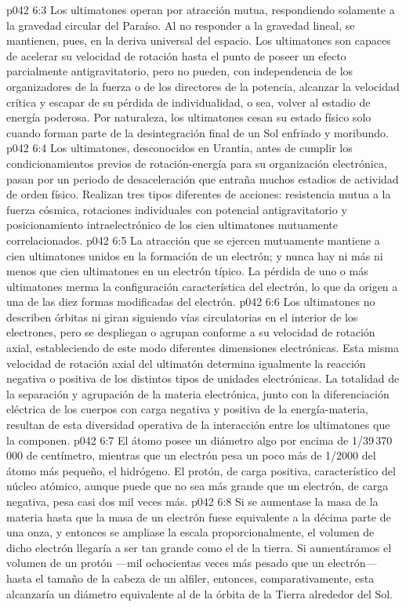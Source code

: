 \vs p042 6:3 \pc Los ultimatones operan por atracción mutua, respondiendo solamente a la gravedad circular del Paraíso. Al no responder a la gravedad lineal, se mantienen, pues, en la deriva universal del espacio. Los ultimatones son capaces de acelerar su velocidad de rotación hasta el punto de poseer un efecto parcialmente antigravitatorio, pero no pueden, con independencia de los organizadores de la fuerza o de los directores de la potencia, alcanzar la velocidad crítica y escapar de su pérdida de individualidad, o sea, volver al estadio de energía poderosa. Por naturaleza, los ultimatones cesan su estado físico solo cuando forman parte de la desintegración final de un Sol enfriado y moribundo.
\vs p042 6:4 \pc Los ultimatones, desconocidos en Urantia, antes de cumplir los condicionamientos previos de rotación\hyp{}energía para su organización electrónica, pasan por un periodo de desaceleración que entraña muchos estadios de actividad de orden físico. Realizan tres tipos diferentes de acciones: resistencia mutua a la fuerza cósmica, rotaciones individuales con potencial antigravitatorio y posicionamiento intraelectrónico de los cien ultimatones mutuamente correlacionados.
\vs p042 6:5 La atracción que se ejercen mutuamente mantiene a cien ultimatones unidos en la formación de un electrón; y nunca hay ni más ni menos que cien ultimatones en un electrón típico. La pérdida de uno o más ultimatones merma la configuración característica del electrón, lo que da origen a una de las diez formas modificadas del electrón.
\vs p042 6:6 Los ultimatones no describen órbitas ni giran siguiendo vías circulatorias en el interior de los electrones, pero se despliegan o agrupan conforme a su velocidad de rotación axial, estableciendo de este modo diferentes dimensiones electrónicas. Esta misma velocidad de rotación axial del ultimatón determina igualmente la reacción negativa o positiva de los distintos tipos de unidades electrónicas. La totalidad de la separación y agrupación de la materia electrónica, junto con la diferenciación eléctrica de los cuerpos con carga negativa y positiva de la energía\hyp{}materia, resultan de esta diversidad operativa de la interacción entre los ultimatones que la componen.
\vs p042 6:7 \pc El átomo posee un diámetro algo por encima de 1/39\,370\,000 de centímetro, mientras que un electrón pesa un poco más de 1/2000 del átomo más pequeño, el hidrógeno. El protón, de carga positiva, característico del núcleo atómico, aunque puede que no sea más grande que un electrón, de carga negativa, pesa casi dos mil veces más.
\vs p042 6:8 \pc Si se aumentase la masa de la materia hasta que la masa de un electrón fuese equivalente a la décima parte de una onza, y entonces se ampliase la escala proporcionalmente, el volumen de dicho electrón llegaría a ser tan grande como el de la tierra. Si aumentáramos el volumen de un protón ---mil ochocientas veces más pesado que un electrón--- hasta el tamaño de la cabeza de un alfiler, entonces, comparativamente, esta alcanzaría un diámetro equivalente al de la órbita de la Tierra alrededor del Sol.
